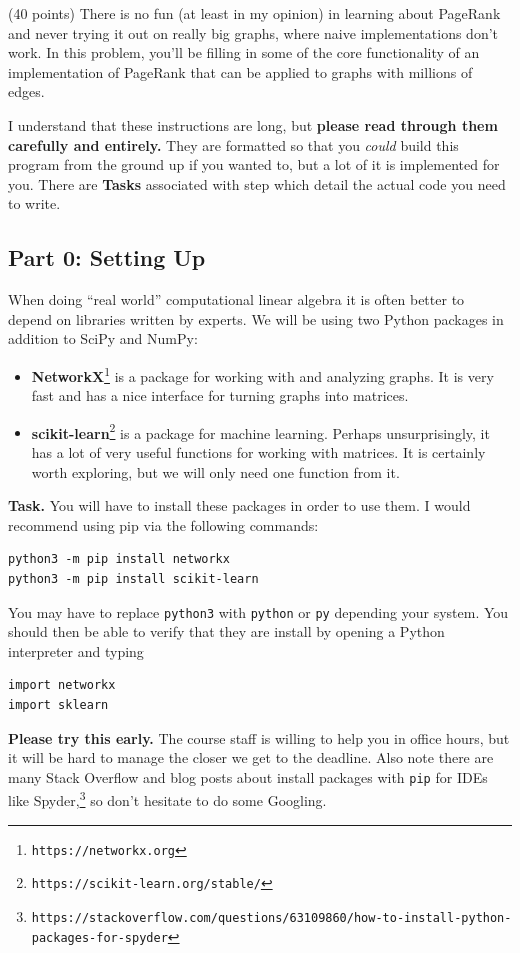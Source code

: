 \documentclass{article}
\theoremstyle{remark}
\begin{document}
(40 points) There is no fun (at least in my opinion) in learning about PageRank and never trying it out on really big graphs, where naive implementations don't work.
In this problem, you'll be filling in some of the core functionality of an implementation of PageRank that can be applied to graphs with millions of edges.

I understand that these instructions are long, but \textbf{please read through them carefully and entirely.}
They are formatted so that you \textit{could} build this program from the ground up if you wanted to, but a lot of it is implemented for you.
There are \textbf{Tasks} associated with step which detail the actual code you need to write.

\subsection*{Part 0: Setting Up}

When doing ``real world'' computational linear algebra it is often better to depend on libraries written by experts.
We will be using two Python packages in addition to SciPy and NumPy:
\begin{itemize}
\item
  \textbf{NetworkX}\footnote{\texttt{https://networkx.org}} is a package for working with and analyzing graphs.
  It is very fast and has a nice interface for turning graphs into matrices.
\item
  \textbf{scikit-learn}\footnote{\texttt{https://scikit-learn.org/stable/}} is a package for machine learning.
  Perhaps unsurprisingly, it has a lot of very useful functions for working with matrices.
  It is certainly worth exploring, but we will only need one function from it.
\end{itemize}

\smallskip
\noindent
\textbf{Task.}
You will have to install these packages in order to use them.
I would recommend using pip via the following commands:
\begin{lstlisting}
python3 -m pip install networkx
python3 -m pip install scikit-learn
\end{lstlisting}
You may have to replace \texttt{python3} with \texttt{python} or \texttt{py} depending your system.
You should then be able to verify that they are install by opening a Python interpreter and typing
\begin{lstlisting}
import networkx
import sklearn
\end{lstlisting}
\textbf{Please try this early.} The course staff is willing to help you in office hours, but it will be hard to manage the closer we get to the deadline.
Also note there are many Stack Overflow and blog posts about install packages with \texttt{pip} for IDEs like Spyder,\footnote{ \texttt{https://stackoverflow.com/questions/63109860/how-to-install-python-packages-for-spyder}} so don't hesitate to do some Googling.
\end{document}
